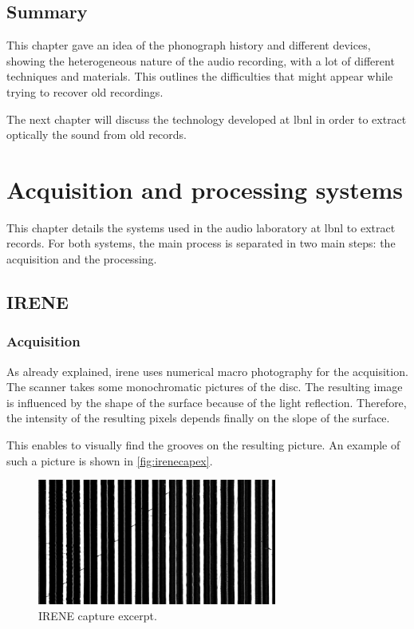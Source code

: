 \section{Summary}

This chapter gave an idea of the phonograph history and different devices, showing the heterogeneous nature of the audio recording, with a lot of different techniques and materials. This outlines the difficulties that might appear while trying to recover old recordings.

The next chapter will discuss the technology developed at \gls{lbnl} in order to extract optically the sound from old records.

\chapter{Acquisition and processing systems}

This chapter details the systems used in the audio laboratory at \gls{lbnl} to extract records. For both systems, the main process is separated in two main steps: the acquisition and the processing.

\section{IRENE}

\subsection{Acquisition}

As already explained, \gls{irene} uses numerical macro photography for the acquisition. The scanner takes some monochromatic pictures of the disc. The resulting image is influenced by the shape of the surface because of the light reflection. Therefore, the intensity of the resulting pixels depends finally on the slope of the surface.

This enables to visually find the grooves on the resulting picture. An example of such a picture is shown in \autoref{fig:irenecapex}.

\begin{figure}[!ht]
\centering
\includegraphics[width=0.7\textwidth]{images/irene-capture-ex}
\caption{IRENE capture excerpt.}
\label{fig:irenecapex}
\end{figure}

